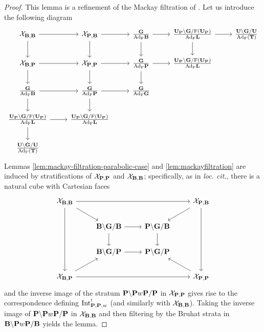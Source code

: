 \documentclass[article, 10pt, oneside, reqno]{amsart}
\theoremstyle{plain}
\theoremstyle{definition}
\theoremstyle{remark}
\begin{document}
\begin{proof}
This lemma is a refinement of the Mackay filtration of \cite[Lemma 3.2.7]{EteveFreeMono}. Let us introduce the following diagram 
\[\begin{tikzcd}
	{\Xcal_{\Bbf, \Bbf}} & {\Xcal_{\Pbf, \Bbf}} & {\frac{\Gbf}{\Ad_{\Frob}\Bbf}} & {\frac{\UP \backslash \Gbf/\Frob(\UP)}{\Ad_{\Frob}\Lbf}} & {\frac{\Ubf\backslash \Gbf/\Ubf}{\Ad_{\Frob}(\Tbf)}} \\
	{\Xcal_{\Bbf, \Pbf}} & {\Xcal_{\Pbf, \Pbf}} & {\frac{\Gbf}{\Ad_{\Frob}\Pbf}} & {\frac{\UP \backslash \Gbf/\Frob(\UP)}{\Ad_{\Frob}\Lbf}} \\
	{\frac{\Gbf}{\Ad_{\Frob}\Bbf}} & {\frac{\Gbf}{\Ad_{\Frob}\Pbf}} & {\frac{\Gbf}{\Ad_{\Frob}\Gbf}} \\
	{\frac{\UP \backslash \Gbf/\Frob(\UP)}{\Ad_{\Frob}\Lbf}} & {\frac{\UP \backslash \Gbf/\Frob(\UP)}{\Ad_{\Frob}\Lbf}} \\
	{\frac{\Ubf\backslash \Gbf/\Ubf}{\Ad_{\Frob}(\Tbf)}}
	\arrow[from=1-1, to=1-2]
	\arrow[from=1-1, to=2-1]
	\arrow[from=1-2, to=1-3]
	\arrow[from=1-2, to=2-2]
	\arrow[from=1-3, to=1-4]
	\arrow[from=1-3, to=2-3]
	\arrow[from=1-4, to=1-5]
	\arrow[from=1-4, to=2-4]
	\arrow[from=2-1, to=2-2]
	\arrow[from=2-1, to=3-1]
	\arrow[from=2-2, to=2-3]
	\arrow[from=2-2, to=3-2]
	\arrow[from=2-3, to=2-4]
	\arrow[from=2-3, to=3-3]
	\arrow[from=3-1, to=3-2]
	\arrow[from=3-1, to=4-1]
	\arrow[from=3-2, to=3-3]
	\arrow[from=3-2, to=4-2]
	\arrow[from=4-1, to=4-2]
	\arrow[from=4-1, to=5-1]
\end{tikzcd}\]
Lemmas \ref{lem:mackay-filtration-parabolic-case} and \ref{lem:mackayfiltration} are induced by stratifications of $\mathcal{X}_{\mathbf{P},\mathbf{P}}$ and $\mathcal{X}_{\mathbf{B}, \mathbf{B}}$; specifically, as in \emph{loc. cit.}, there is a natural cube with Cartesian faces 
\[\begin{tikzcd}
	{\Xcal_{\Bbf, \Bbf}} &&& {\Xcal_{\Pbf, \Bbf}} \\
	& {\Bbf\backslash\Gbf/\Bbf} & {\Pbf\backslash\Gbf/\Bbf} \\
	& {\Bbf\backslash\Gbf/\Pbf} & {\Pbf\backslash\Gbf/\Pbf} \\
	{\Xcal_{\Bbf, \Pbf}} &&& {\Xcal_{\Pbf, \Pbf}}
	\arrow[from=1-1, to=1-4]
	\arrow[from=1-1, to=2-2]
	\arrow[from=1-1, to=4-1]
	\arrow[from=1-4, to=2-3]
	\arrow[from=1-4, to=4-4]
	\arrow[from=2-2, to=2-3]
	\arrow[from=2-2, to=3-2]
	\arrow[from=2-3, to=3-3]
	\arrow[from=3-2, to=3-3]
	\arrow[from=4-1, to=3-2]
	\arrow[from=4-1, to=4-4]
	\arrow[from=4-4, to=3-3]
\end{tikzcd}\]
and the inverse image of the stratum $\mathbf{P} \backslash \mathbf{P} w \mathbf{P} /\mathbf{P}$ in $\mathcal{X}_{\mathbf{P}, \mathbf{P}}$ gives rise to the correspondence defining $\mathrm{Int}_{\mathbf{P},\mathbf{P}, w}^!$ (and similarly with $\mathcal{X}_{\mathbf{B}, \mathbf{B}}$). Taking the inverse image of $\mathbf{P} \backslash \mathbf{P} w \mathbf{P} /\mathbf{P}$ in $\mathcal{X}_{\mathbf{B}, \mathbf{B}}$ and then filtering by the Bruhat strata in $\mathbf{B} \backslash \mathbf{P} w \mathbf{P} /\mathbf{B}$ yields the lemma.
\end{proof}
\end{document}
